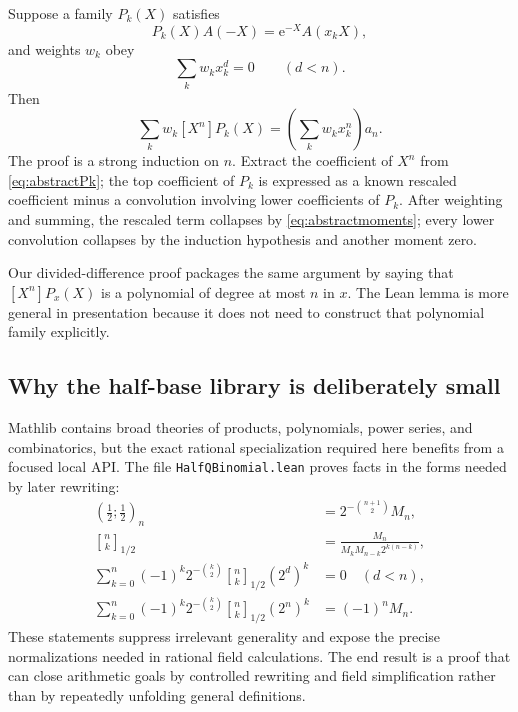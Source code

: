 \documentclass[11pt,oneside]{article}
\theoremstyle{definition}
\theoremstyle{remark}
\newcommand{\qpoch}[3]{\left(#1;#2\right)_{#3}}
\newcommand{\halfqbinom}[2]{{\genfrac{[}{]}{0pt}{}{#1}{#2}}_{1/2}}
\newcommand{\coeff}[2]{\left[#1^{#2}\right]}
\newcommand{\e}{\mathrm e}
\begin{document}
Suppose a family $P_k(X)$ satisfies
\begin{equation}\label{eq:abstractPk}
 P_k(X)A(-X)=\e^{-X}A(x_kX),
\end{equation}
and weights $w_k$ obey
\begin{equation}\label{eq:abstractmoments}
 \sum_kw_kx_k^d=0\qquad(d<n).
\end{equation}
Then
\begin{equation}\label{eq:abstractisolation}
 \sum_kw_k\coeff{X}{n}P_k(X)
 =\left(\sum_kw_kx_k^n\right)a_n.
\end{equation}
The proof is a strong induction on $n$.  Extract the coefficient of $X^n$
from \eqref{eq:abstractPk}; the top coefficient of $P_k$ is expressed as a
known rescaled coefficient minus a convolution involving lower coefficients
of $P_k$.  After weighting and summing, the rescaled term collapses by
\eqref{eq:abstractmoments}; every lower convolution collapses by the
induction hypothesis and another moment zero.

Our divided-difference proof packages the same argument by saying that
$\coeff{X}{n}P_x(X)$ is a polynomial of degree at most $n$ in $x$.  The Lean
lemma is more general in presentation because it does not need to construct
that polynomial family explicitly.

\subsection{Why the half-base library is deliberately small}

Mathlib contains broad theories of products, polynomials, power series, and
combinatorics, but the exact rational specialization required here benefits
from a focused local API.  The file \texttt{HalfQBinomial.lean} proves facts
in the forms needed by later rewriting:
\begin{align*}
 \qpoch{\tfrac12}{\tfrac12}{n}
 &=2^{-\binom{n+1}{2}}M_n,\\
 \halfqbinom{n}{k}
 &=\frac{M_n}{M_kM_{n-k}2^{k(n-k)}},\\
 \sum_{k=0}^{n}(-1)^k2^{-\binom{k}{2}}
 \halfqbinom{n}{k}(2^d)^k&=0\quad(d<n),\\
 \sum_{k=0}^{n}(-1)^k2^{-\binom{k}{2}}
 \halfqbinom{n}{k}(2^n)^k&=(-1)^nM_n.
\end{align*}
These statements suppress irrelevant generality and expose the precise
normalizations needed in rational field calculations.  The end result is a
proof that can close arithmetic goals by controlled rewriting and field
simplification rather than by repeatedly unfolding general definitions.
\end{document}
